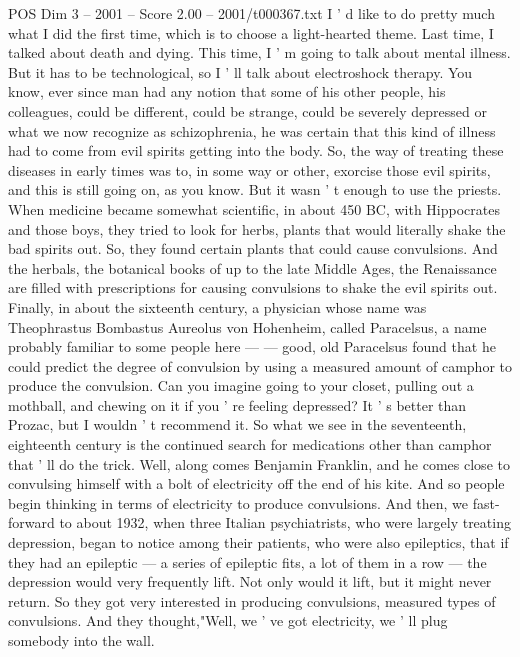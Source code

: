 \begin{textsample}{POS Dim 3 – 2001 – Score 2.00 – 2001/t000367.txt}  \label{ex:f3_pos_003}
I ' d like to do pretty much what I did the first time, which is to choose a light-hearted theme.
Last time, I talked about death and dying.
This time, I ' m going to talk about mental illness.
But it has to be technological, so I ' ll talk about electroshock therapy.
You know, ever since man had any notion that some of his other people, his colleagues, could be different, could be strange, could be severely depressed or what we now recognize as schizophrenia, he was certain that this kind of illness had to come from evil spirits getting into the body.
So, the way of treating these diseases in early times was to, in some way or other, exorcise those evil spirits, and this is still going on, as you know.
But it wasn ' t enough to use the priests.
When medicine became somewhat scientific, in about 450 BC, with Hippocrates and those boys, they tried to look for herbs, plants that would literally shake the bad spirits out.
So, they found certain plants that could cause convulsions.
And the herbals, the botanical books of up to the late Middle Ages, the Renaissance are filled with prescriptions for causing convulsions to shake the evil spirits out.
Finally, in about the sixteenth century, a physician whose name was Theophrastus Bombastus Aureolus von Hohenheim, called Paracelsus, a name probably familiar to some people here — — good, old Paracelsus found that he could predict the degree of convulsion by using a measured amount of camphor to produce the convulsion.
Can you imagine going to your closet, pulling out a mothball, and chewing on it if you ' re feeling depressed?
It ' s better than Prozac, but I wouldn ' t recommend it.
So what we see in the seventeenth, eighteenth century is the continued search for medications other than camphor that ' ll do the trick.
Well, along comes Benjamin Franklin, and he comes close to convulsing himself with a bolt of electricity off the end of his kite.
And so people begin thinking in terms of electricity to produce convulsions.
And then, we fast-forward to about 1932, when three Italian psychiatrists, who were largely treating depression, began to notice among their patients, who were also epileptics, that if they had an epileptic — a series of epileptic fits, a lot of them in a row — the depression would very frequently lift.
Not only would it lift, but it might never return.
So they got very interested in producing convulsions, measured types of convulsions.
And they thought,"Well, we ' ve got electricity, we ' ll plug somebody into the wall.

\end{textsample}
